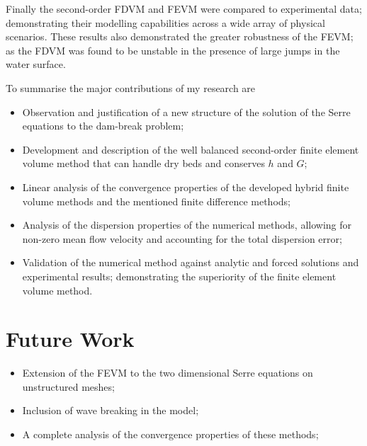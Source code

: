 Finally the second-order FDVM and FEVM  were compared to experimental data; demonstrating their modelling capabilities across a wide array of physical scenarios. These results also demonstrated the greater robustness of the FEVM; as the FDVM was found to be unstable in the presence of large jumps in the water surface. 

To summarise the major contributions of my research are
\begin{itemize}
	\item Observation and justification of a new structure of the solution of the Serre equations to the dam-break problem;
	\item Development and description of the well balanced second-order finite element volume method that can handle dry beds and conserves $h$ and $G$;
	\item Linear analysis of the convergence properties of the developed hybrid finite volume methods and the mentioned finite difference methods;
	\item Analysis of the dispersion properties of the numerical methods, allowing for non-zero mean flow velocity and accounting for the total dispersion error;
	\item Validation of the numerical method against analytic and forced solutions and experimental results; demonstrating the superiority of the finite element volume method. 
\end{itemize}

\section{Future Work}

\begin{itemize}
	\item Extension of the FEVM to the two dimensional Serre equations on unstructured meshes;
	\item Inclusion of wave breaking in the model; 
	\item A complete analysis of the convergence properties of these methods;
\end{itemize}




